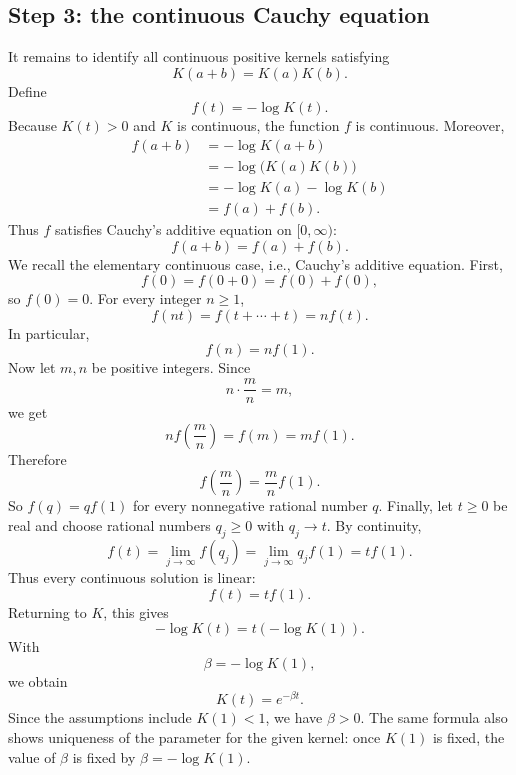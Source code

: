 \documentclass[12pt,a4paper]{article}
\begin{document}
\subsection*{Step 3: the continuous Cauchy equation}

It remains to identify all continuous positive kernels satisfying
\[
  K(a+b)=K(a)K(b).
\]
Define
\[
  f(t)=-\log K(t).
\]
Because $K(t)>0$ and $K$ is continuous, the function $f$ is continuous.  Moreover,
\[
\begin{aligned}
  f(a+b)
  &=-\log K(a+b) \\
  &=-\log\bigl(K(a)K(b)\bigr) \\
  &=-\log K(a)-\log K(b) \\
  &=f(a)+f(b).
\end{aligned}
\]
Thus $f$ satisfies Cauchy's additive equation on $[0,\infty)$:
\[
  f(a+b)=f(a)+f(b).
\]
We recall the elementary continuous case, i.e., Cauchy's additive equation.  First,
\[
  f(0)=f(0+0)=f(0)+f(0),
\]
so $f(0)=0$.  For every integer $n\geq1$,
\[
  f(nt)=f(t+\cdots+t)=n f(t).
\]
In particular,
\[
  f(n)=n f(1).
\]
Now let $m,n$ be positive integers.  Since
\[
  n\cdot\frac{m}{n}=m,
\]
we get
\[
  n f\!\left(\frac{m}{n}\right)
  =f(m)
  =m f(1).
\]
Therefore
\[
  f\!\left(\frac{m}{n}\right)
  =\frac{m}{n}f(1).
\]
So $f(q)=qf(1)$ for every nonnegative rational number $q$.  Finally, let $t\geq0$ be real and choose rational numbers $q_j\geq0$ with $q_j\to t$.  By continuity,
\[
  f(t)=\lim_{j\to\infty} f(q_j)
      =\lim_{j\to\infty} q_j f(1)
      =t f(1).
\]
Thus every continuous solution is linear:
\[
  f(t)=t f(1).
\]
Returning to $K$, this gives
\[
  -\log K(t)=t(-\log K(1)).
\]
With
\[
  \beta=-\log K(1),
\]
we obtain
\[
  K(t)=e^{-\beta t}.
\]
Since the assumptions include $K(1)<1$, we have $\beta>0$.  The same formula also shows uniqueness of the parameter for the given kernel: once $K(1)$ is fixed, the value of $\beta$ is fixed by $\beta=-\log K(1)$.
\end{document}
